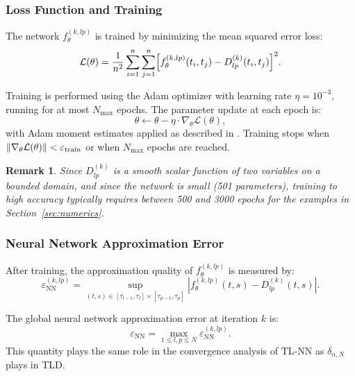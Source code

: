 \documentclass[12pt, a4paper]{article}
\newtheorem{remark}[theorem]{Remark}
\newcommand{\norm}[1]{\left\| #1 \right\|}
\newcommand{\ftheta}{f_{\theta}^{(k,lp)}}
\newcommand{\epsNN}{\varepsilon_{\mathrm{NN}}}
\begin{document}
\subsubsection{Loss Function and Training}

The network $\ftheta$ is trained by minimizing the mean
squared error loss:
\begin{equation}
  \mathcal{L}(\theta) =
  \frac{1}{n^2} \sum_{i=1}^{n} \sum_{j=1}^{n}
  \Bigl[
    \ftheta(t_i, t_j) - D_{lp}^{(k)}(t_i, t_j)
  \Bigr]^2.
  \label{eq:loss}
\end{equation}

Training is performed using the Adam optimizer
\cite{kingma2015} with learning rate $\eta = 10^{-3}$,
running for at most $N_{\max}$ epochs.
The parameter update at each epoch is:
\begin{equation}
  \theta \leftarrow \theta - \eta \cdot \nabla_\theta
  \mathcal{L}(\theta),
  \label{eq:adam}
\end{equation}
with Adam moment estimates applied as described in
\cite{kingma2015}.
Training stops when
$\norm{\nabla_\theta \mathcal{L}(\theta)} < \varepsilon_{\rm train}$
or when $N_{\max}$ epochs are reached.

\begin{remark}
  Since $D_{lp}^{(k)}$ is a smooth scalar function of two
  variables on a bounded domain, and since the network is
  small (501 parameters), training to high accuracy typically
  requires between 500 and 3000 epochs for the examples
  in Section~\ref{sec:numerics}.
\end{remark}

\subsubsection{Neural Network Approximation Error}

After training, the approximation quality of $\ftheta$ is
measured by:
\begin{equation}
  \epsNN^{(k,lp)} = \sup_{(t,s) \in
  [\tau_{l-1}, \tau_l] \times [\tau_{p-1}, \tau_p]}
  \left|
    \ftheta(t, s) - D_{lp}^{(k)}(t, s)
  \right|.
  \label{eq:nn_error}
\end{equation}

The global neural network approximation error at iteration
$k$ is:
\begin{equation}
  \epsNN = \max_{1 \leq l, p \leq N} \epsNN^{(k,lp)}.
  \label{eq:nn_error_global}
\end{equation}
This quantity plays the same role in the convergence analysis
of TL-NN as $\delta_{n,N}$ plays in TLD.
\end{document}
